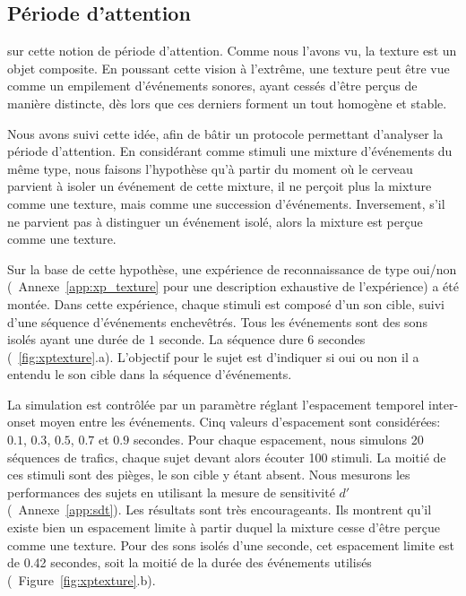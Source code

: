 \subsection{Période d'attention}

  sur cette notion de période d'attention. Comme nous l'avons vu, la texture est un objet composite. En poussant cette vision à l’extrême, une texture peut être vue comme un empilement d’événements sonores, ayant cessés d'être perçus de manière distincte, dès lors que ces derniers forment un tout homogène et stable. 

Nous avons suivi cette idée, afin de bâtir un protocole permettant d'analyser la période d'attention. En considérant comme stimuli une mixture d'événements du même type, nous faisons l'hypothèse qu'à partir du moment où le cerveau parvient à isoler un événement de cette mixture, il ne perçoit plus la mixture comme une texture, mais comme une succession d'événements. Inversement, s'il ne parvient pas à distinguer un événement isolé, alors la mixture est perçue comme une texture.

Sur la base de cette hypothèse, une expérience de reconnaissance de type oui/non (\Cf~Annexe~\ref{app:xp_texture} pour une description exhaustive de l'expérience) a été montée. Dans cette expérience, chaque stimuli est composé d'un son cible, suivi d'une séquence d'événements enchevêtrés. Tous les événements sont des sons isolés ayant une durée de $1$ seconde. La séquence dure 6 secondes (\Cf~\ref{fig:xptexture}.a). L'objectif pour le sujet est d'indiquer si oui ou non il a entendu le son cible dans la séquence d’événements.

 La simulation est contrôlée par un paramètre réglant l'espacement temporel inter-onset moyen entre les événements. Cinq valeurs d'espacement sont considérées: $0.1$, $0.3$, $0.5$, $0.7$ et $0.9$ secondes. Pour chaque espacement, nous simulons 20 séquences de trafics, chaque sujet devant alors écouter 100 stimuli. La moitié de ces stimuli sont des pièges, le son cible y étant absent. Nous mesurons les performances des sujets en utilisant la mesure de sensitivité $d'$ (\Cf~Annexe~\ref{app:sdt}). Les résultats sont très encourageants. Ils montrent qu'il existe bien un espacement limite à partir duquel la mixture cesse d'être perçue comme une texture. Pour des sons isolés d'une seconde, cet espacement limite est de 0.42 secondes, soit la moitié de la durée des événements utilisés (\Cf~Figure~\ref{fig:xptexture}.b).


